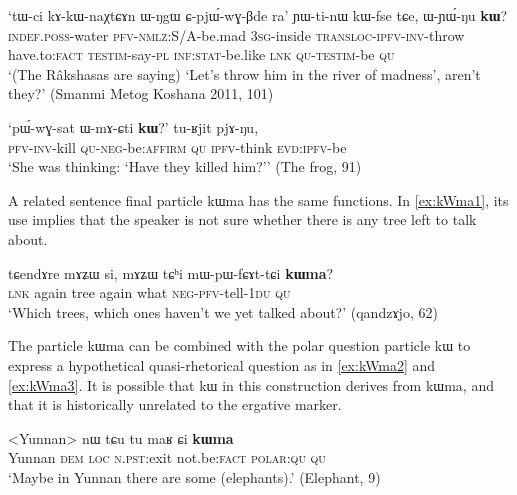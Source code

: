 \documentclass[oldfontcommands,oneside,a4paper,11pt]{article}
\newcommand{\ipa}[1]{{\phon #1}} %
\begin{document}
 \begin{exe} 
 \ex \label{ex:kAkWnaXtCAn}
\gll 
`\ipa{tɯ-ci} 	\ipa{kɤ-kɯ-naχtɕɤn} 	\ipa{ɯ-ŋgɯ} 	\ipa{ɕ-pjɯ́-wɣ-βde} 	\ipa{ra}' 	\ipa{ɲɯ-ti-nɯ} 	\ipa{kɯ-fse} 	\ipa{tɕe,} 	\ipa{ɯ-ɲɯ́-ŋu} 	\ipa{\textbf{kɯ}?} \\
\textsc{indef.poss}-water \textsc{pfv-nmlz}:S/A-be.mad \textsc{3sg}-inside \textsc{transloc-ipfv-inv}-throw have.to:\textsc{fact} \textsc{testim}-say-\textsc{pl} \textsc{inf:stat}-be.like \textsc{lnk} \textsc{qu-testim}-be \textsc{qu} \\
\glt `(The Râkshasas are saying)  `Let's throw him in the river of madness', aren't they?' (Smanmi Metog Koshana 2011, 101)
\end{exe} 
 
  \begin{exe} 
 \ex \label{ex:pWwGsat}
\gll 
`\ipa{pɯ́-wɣ-sat} 	\ipa{ɯ-mɤ-ɕti} 	\ipa{\textbf{kɯ}?}' 	\ipa{tu-ʁjit} 	\ipa{pjɤ-ŋu,} \\
\textsc{pfv-inv}-kill \textsc{qu-neg}-be:\textsc{affirm} \textsc{qu} \textsc{ipfv}-think \textsc{evd:ipfv}-be \\
\glt `She was thinking: `Have they killed him?'' (The frog, 91)
 \end{exe}  
 
 A related sentence final particle \ipa{kɯma} has the same functions. In  \ref{ex:kWma1}, its use implies that   the speaker is not sure whether there is any tree left to talk about.
   \begin{exe} 
 \ex \label{ex:kWma1}
\gll 
 \ipa{tɕendɤre} 	\ipa{mɤʑɯ} 	\ipa{si,} 	\ipa{mɤʑɯ} 	\ipa{tɕʰi} 	\ipa{mɯ-pɯ-fɕɤt-tɕi} 	\ipa{\textbf{kɯma}?} \\
\textsc{lnk} again tree again what \textsc{neg-pfv}-tell-\textsc{1du} \textsc{qu} \\
\glt `Which trees, which ones haven't we yet talked about?'  (qandzɤjo, 62)
  \end{exe} 
  
  The particle \ipa{kɯma} can be combined with the polar question particle \ipa{kɯ} to express a hypothetical quasi-rhetorical question as in \ref{ex:kWma2} and \ref{ex:kWma3}.      It is possible that \ipa{kɯ} in this construction derives from \ipa{kɯma}, and that it is historically unrelated to the ergative marker.
  
     \begin{exe} 
 \ex \label{ex:kWma2}
\gll 
 <Yunnan> \ipa{nɯ} 	\ipa{tɕu} 	\ipa{tu} 	\ipa{maʁ} 	\ipa{ɕi} 	\ipa{\textbf{kɯma}} \\
 Yunnan \textsc{dem} \textsc{loc} \textsc{n.pst:}exit not.be:\textsc{fact} \textsc{polar:qu} \textsc{qu} \\
\glt  `Maybe in Yunnan there are some (elephants).' (Elephant, 9)
   \end{exe}
   
\end{document}
